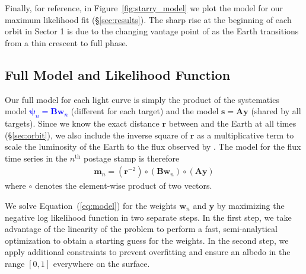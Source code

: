 \documentclass[modern]{aastex62}
\newcommand{\edited}[1]{\textcolor{blue}{#1}}
\begin{document}
Finally, for reference, in Figure~\ref{fig:starry_model} we plot the
\starry model for our maximum likelihood fit (\S\ref{sec:results}). The
sharp rise at the beginning of each orbit in Sector 1 is due to the changing
vantage point of \TESS as the Earth transitions from a thin crescent to full phase.

\subsection{Full Model and Likelihood Function}
\label{sec:model}

Our full model for each light curve is simply the product of the 
systematics model 
\edited{$\boldsymbol{\psi}_n = \mathbf{B}\mathbf{w}_n$}
 (different for each target) and
the \starry model $\mathbf{s} = \mathbf{A}\mathbf{y}$ (shared by all targets). Since we 
know the exact distance $\mathbf{r}$ between \TESS and the Earth at all times
(\S\ref{sec:orbit}), we also include the inverse square of $\mathbf{r}$ 
as a multiplicative term to scale the luminosity 
of the Earth to the flux observed by \TESS. The model for the flux time series
in the $n^\mathrm{th}$ postage stamp is therefore
%
\begin{align}
    \label{eq:model}
    \mathbf{m}_n = (\mathbf{r}^{-2}) \circ (\mathbf{B} \mathbf{w}_n) \circ (\mathbf{A} \mathbf{y})
\end{align}
%
where $\circ$ denotes the element-wise product of two vectors.

We solve Equation~(\ref{eq:model}) for the weights $\mathbf{w}_n$ and $\mathbf{y}$
by maximizing the negative log likelihood function in two separate steps. In the
first step, we take advantage of the linearity of the problem to perform a fast,
semi-analytical optimization to obtain a starting guess for the weights. In the
second step, we apply additional constraints to prevent overfitting and ensure
an albedo in the range $[0, 1]$ everywhere on the surface.
\end{document}
